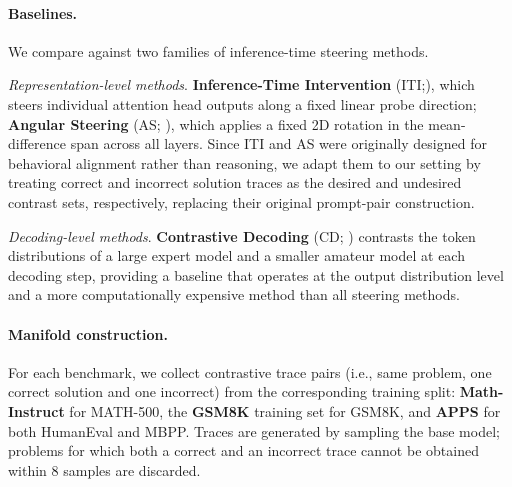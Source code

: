 \documentclass{article}
\begin{document}
\paragraph{Baselines.}
We compare against two families of inference-time steering methods. 

\emph{Representation-level methods}. \textbf{Inference-Time Intervention}  (ITI;\citealt{li2023iti}), which steers individual attention head outputs
along a fixed linear probe direction; \textbf{Angular Steering} (AS; \citealt{vu2025angular}), which applies a fixed 2D rotation in the mean-difference span across all layers. Since ITI and AS were originally designed for behavioral alignment rather than reasoning, we adapt them to our setting by treating correct and incorrect solution traces as the desired and undesired contrast sets, respectively, replacing their original prompt-pair construction.

\emph{Decoding-level methods}. \textbf{Contrastive Decoding} (CD; \citealt{li2023contrastive}) contrasts  the token distributions of a large expert model and a smaller amateur model at each decoding step, providing a baseline that operates at the output distribution level and a more computationally expensive method than all steering methods.

\paragraph{Manifold construction.}
For each benchmark, we collect contrastive trace pairs (i.e., same problem, one correct solution and one incorrect) from the corresponding training split: \textbf{Math-Instruct} \cite{yue2023mammoth} for MATH-500, the \textbf{GSM8K} \cite{cobbe2021gsm8k} training set for GSM8K, and \textbf{APPS} \cite{hendrycks2021apps} for both HumanEval \cite{chen2021codex} and MBPP\cite{austin2021program}. Traces are generated by sampling the base model; problems for which both a correct and an incorrect trace cannot be obtained within 8 samples are discarded. 
\end{document}
